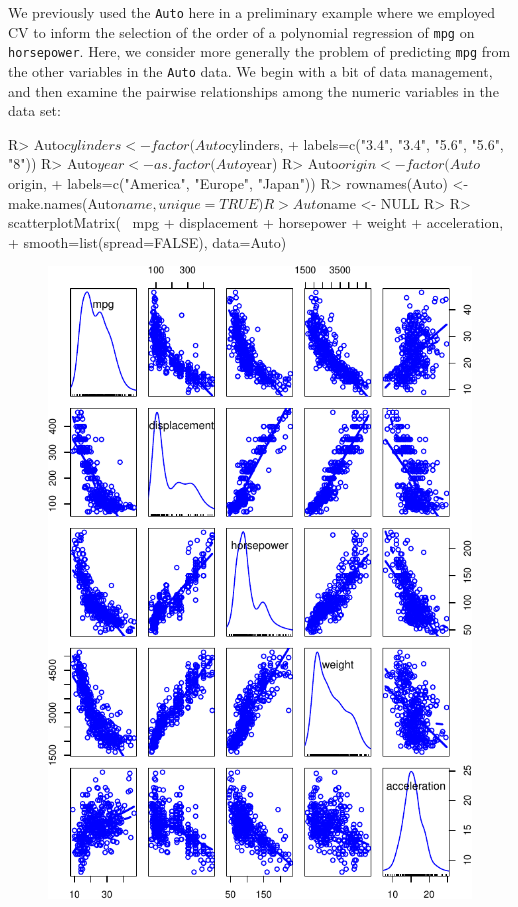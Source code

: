 \documentclass[
]{jss}
\begin{document}
We previously used the \texttt{Auto} here in a preliminary example where
we employed CV to inform the selection of the order of a polynomial
regression of \texttt{mpg} on \texttt{horsepower}. Here, we consider
more generally the problem of predicting \texttt{mpg} from the other
variables in the \texttt{Auto} data. We begin with a bit of data
management, and then examine the pairwise relationships among the
numeric variables in the data set:

\begin{CodeChunk}
\begin{CodeInput}
R> Auto$cylinders <- factor(Auto$cylinders,
+                          labels=c("3.4", "3.4", "5.6", "5.6", "8"))
R> Auto$year <- as.factor(Auto$year)
R> Auto$origin <- factor(Auto$origin,
+                       labels=c("America", "Europe", "Japan"))
R> rownames(Auto) <- make.names(Auto$name, unique=TRUE)
R> Auto$name <- NULL
R> 
R> scatterplotMatrix(~ mpg + displacement + horsepower + weight + acceleration, 
+                   smooth=list(spread=FALSE), data=Auto)
\end{CodeInput}
\begin{figure}

{\centering \includegraphics[width=1\linewidth]{JSS-article_files/figure-latex/Auto-explore-1} 

}
\end{figure}
\end{CodeChunk}
\end{document}
